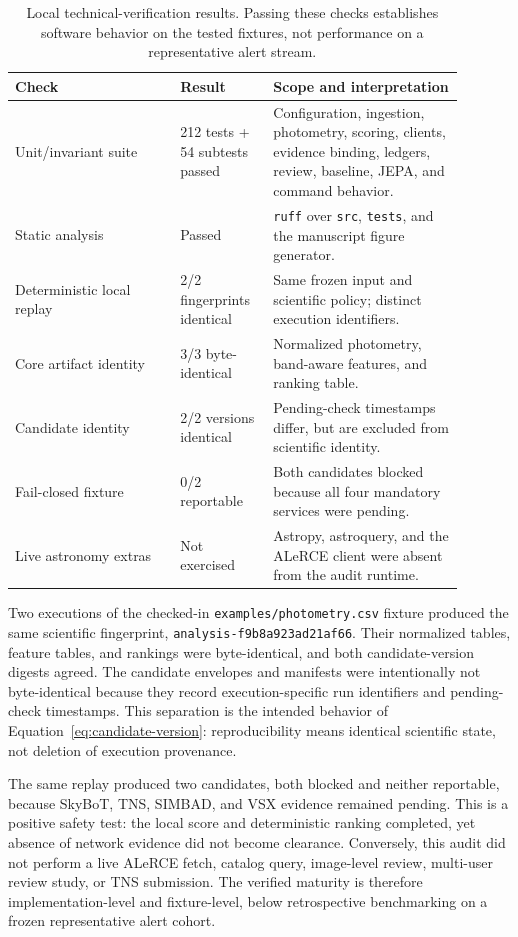 \documentclass[11pt]{article}
\begin{document}
\begin{table}[ht]
\centering
\caption{Local technical-verification results. Passing these checks establishes software behavior on the tested fixtures, not performance on a representative alert stream.}
\label{tab:software-verification}
\begin{tabular}{p{0.33\linewidth}p{0.18\linewidth}p{0.38\linewidth}}
\toprule
Check & Result & Scope and interpretation \\
\midrule
Unit/invariant suite & 212 tests + 54 subtests passed & Configuration, ingestion, photometry, scoring, clients, evidence binding, ledgers, review, baseline, JEPA, and command behavior. \\
Static analysis & Passed & \texttt{ruff} over \texttt{src}, \texttt{tests}, and the manuscript figure generator. \\
Deterministic local replay & 2/2 fingerprints identical & Same frozen input and scientific policy; distinct execution identifiers. \\
Core artifact identity & 3/3 byte-identical & Normalized photometry, band-aware features, and ranking table. \\
Candidate identity & 2/2 versions identical & Pending-check timestamps differ, but are excluded from scientific identity. \\
Fail-closed fixture & 0/2 reportable & Both candidates blocked because all four mandatory services were pending. \\
Live astronomy extras & Not exercised & Astropy, astroquery, and the ALeRCE client were absent from the audit runtime. \\
\bottomrule
\end{tabular}
\end{table}

Two executions of the checked-in \texttt{examples/photometry.csv} fixture produced the same scientific fingerprint, \texttt{analysis-f9b8a923ad21af66}. Their normalized tables, feature tables, and rankings were byte-identical, and both candidate-version digests agreed. The candidate envelopes and manifests were intentionally not byte-identical because they record execution-specific run identifiers and pending-check timestamps. This separation is the intended behavior of Equation~\ref{eq:candidate-version}: reproducibility means identical scientific state, not deletion of execution provenance.

The same replay produced two candidates, both blocked and neither reportable, because SkyBoT, TNS, SIMBAD, and VSX evidence remained pending. This is a positive safety test: the local score and deterministic ranking completed, yet absence of network evidence did not become clearance. Conversely, this audit did not perform a live ALeRCE fetch, catalog query, image-level review, multi-user review study, or TNS submission. The verified maturity is therefore implementation-level and fixture-level, below retrospective benchmarking on a frozen representative alert cohort.
\end{document}
